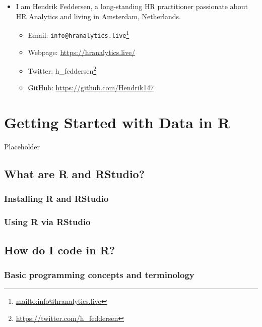 \documentclass[
  12pt, krantz2,
]{krantz}
\providecommand{\tightlist}{%
  \setlength{\itemsep}{0pt}\setlength{\parskip}{0pt}}
\renewcommand{\href}[2]{#2\footnote{\url{#1}}}
\begin{document}
\begin{itemize}
\item
  I am Hendrik Feddersen, a long-standing HR practitioner passionate about HR Analytics and living in Amsterdam, Netherlands.

  \begin{itemize}
  \tightlist
  \item
    Email: \href{mailto:info@hranalytics.live}{\nolinkurl{info@hranalytics.live}}
  \item
    Webpage: \url{https://hranalytics.live/}
  \item
    Twitter: \href{https://twitter.com/h_feddersen}{h\_feddersen}
  \item
    GitHub: \url{https://github.com/Hendrik147}
  \end{itemize}
\end{itemize}

\hypertarget{getting-started}{%
\chapter{Getting Started with Data in R}\label{getting-started}}

Placeholder

\hypertarget{r-rstudio}{%
\section{What are R and RStudio?}\label{r-rstudio}}

\hypertarget{installing-r-and-rstudio}{%
\subsection{Installing R and RStudio}\label{installing-r-and-rstudio}}

\hypertarget{using-r-via-rstudio}{%
\subsection{Using R via RStudio}\label{using-r-via-rstudio}}

\hypertarget{code}{%
\section{How do I code in R?}\label{code}}

\hypertarget{programming-concepts}{%
\subsection{Basic programming concepts and terminology}\label{programming-concepts}}
\end{document}
